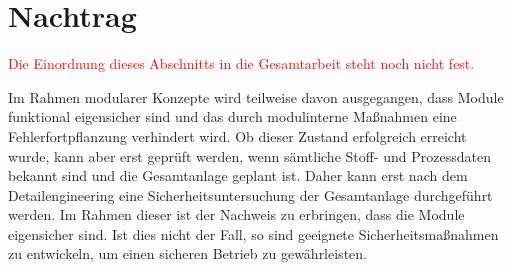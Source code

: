 
\section{Nachtrag}
\textcolor{red}{Die Einordnung dieses Abschnitts in die Gesamtarbeit steht noch nicht fest.}

Im Rahmen modularer Konzepte wird teilweise davon ausgegangen, dass Module funktional eigensicher sind und das durch modulinterne Ma\ss{}nahmen eine Fehlerfortpflanzung verhindert wird. \cite[S. 4]{Urbas_2012a} Ob dieser Zustand erfolgreich erreicht wurde, kann aber erst gepr\"uft werden, wenn s\"amtliche Stoff- und Prozessdaten bekannt sind und die Gesamtanlage geplant ist. Daher kann erst nach dem Detailengineering eine Sicherheitsuntersuchung der Gesamtanlage durchgef\"uhrt werden. Im Rahmen dieser ist der Nachweis zu erbringen, dass die Module eigensicher sind. Ist dies nicht der Fall, so sind geeignete Sicherheitsma\ss{}nahmen zu entwickeln, um einen sicheren Betrieb zu gew\"ahrleisten.  